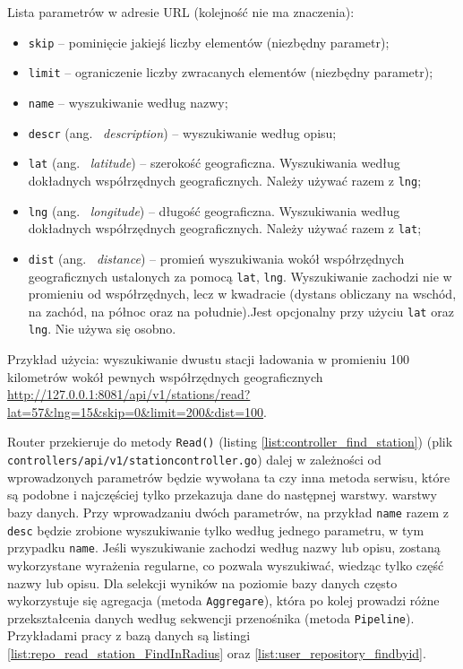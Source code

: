 Lista parametrów w adresie URL (kolejność nie ma znaczenia):
\begin{itemize}
    \item \texttt{skip} -- pominięcie jakiejś liczby elementów (niezbędny parametr);
    \item \texttt{limit} -- ograniczenie liczby zwracanych elementów (niezbędny parametr);
    \item \texttt{name} -- wyszukiwanie według nazwy;
    \item \texttt{descr} (ang. ~\emph{description}) -- wyszukiwanie według opisu;
    \item \texttt{lat} (ang. ~\emph{latitude}) -- szerokość geograficzna. Wyszukiwania według dokładnych współrzędnych geograficznych. Należy używać razem z \texttt{lng};
    \item \texttt{lng} (ang. ~\emph{longitude}) -- długość geograficzna. Wyszukiwania według dokładnych współrzędnych geograficznych. Należy używać razem z \texttt{lat};
    \item \texttt{dist} (ang. ~\emph{distance}) -- promień wyszukiwania wokół współrzędnych geograficznych ustalonych za pomocą \texttt{lat}, \texttt{lng}. Wyszukiwanie zachodzi nie w promieniu od współrzędnych, lecz w kwadracie (dystans obliczany na wschód, na zachód, na północ oraz na południe).Jest opcjonalny przy użyciu \texttt{lat} oraz \texttt{lng}. Nie używa się osobno.
\end{itemize}

Przykład użycia: wyszukiwanie dwustu stacji ładowania w promieniu 100 kilometrów wokół pewnych współrzędnych geograficznych \url{http://127.0.0.1:8081/api/v1/stations/read?lat=57&lng=15&skip=0&limit=200&dist=100}.

Router przekieruje do metody \texttt{Read()} (listing \ref{list:controller_find_station}) (plik \texttt{controllers/api/v1/stationcontroller.go}) dalej w zależności od wprowadzonych parametrów będzie wywołana ta czy inna metoda serwisu, które są podobne i najczęściej tylko przekazuja dane do następnej warstwy. warstwy bazy danych.
Przy wprowadzaniu dwóch parametrów, na przykład \texttt{name} razem z \texttt{desc} będzie zrobione wyszukiwanie tylko według jednego parametru, w tym przypadku \texttt{name}.
Jeśli wyszukiwanie zachodzi według nazwy lub opisu, zostaną wykorzystane wyrażenia regularne, co pozwala wyszukiwać, wiedząc tylko część nazwy lub opisu.
Dla selekcji wyników na poziomie bazy danych często wykorzystuje się agregacja (metoda \texttt{Aggregare}), która po kolej prowadzi różne przekształcenia danych według sekwencji przenośnika (metoda \texttt{Pipeline}). Przykładami pracy z bazą danych są listingi \ref{list:repo_read_station_FindInRadius} oraz \ref{list:user_repository_findbyid}.

